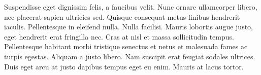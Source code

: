\label{ap:lorem-ipsum}

Suspendisse eget dignissim felis, a faucibus velit. Nunc ornare ullamcorper libero, nec placerat sapien ultricies sed. Quisque consequat metus finibus hendrerit iaculis. Pellentesque in eleifend nulla. Nulla facilisi. Mauris lobortis augue justo, eget hendrerit erat fringilla nec. Cras at nisl et massa sollicitudin tempus. Pellentesque habitant morbi tristique senectus et netus et malesuada fames ac turpis egestas. Aliquam a justo libero. Nam suscipit erat feugiat sodales ultrices. Duis eget arcu at justo dapibus tempus eget eu enim. Mauris at lacus tortor.